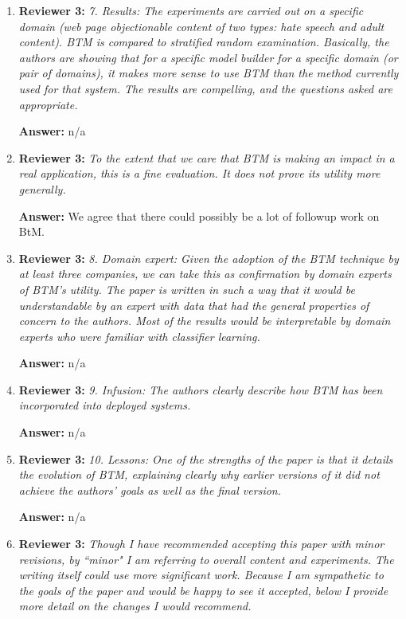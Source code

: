 \documentclass[letterpaper]{article}
\begin{document}
\begin{enumerate}
\item \textbf{Reviewer 3:} \emph{ 7. Results:  The experiments are carried out on a specific domain (web page objectionable content of two types: hate speech and adult content). BTM is compared to stratified random examination. Basically, the authors are showing that for a specific model builder for a specific domain (or pair of domains), it makes more sense to use BTM than the method currently used for that system.  The results are compelling, and the questions asked are appropriate.}

\textbf{Answer:} n/a

\item \textbf{Reviewer 3:} \emph{ To the extent that we care that BTM is making an impact in a real application, this is a fine evaluation.  It does not prove its utility more generally.}

\textbf{Answer:} We agree that there could possibly be a lot of followup work on BtM.

\item \textbf{Reviewer 3:} \emph{ 8. Domain expert: Given the adoption of the BTM technique by at least three companies, we can take this as confirmation by domain experts of BTM's utility. The paper is written in such a way that it would be understandable by an expert with data that had the general properties of concern to the authors. Most of the results would be interpretable by domain experts who were familiar with classifier learning.}

\textbf{Answer:} n/a

\item \textbf{Reviewer 3:} \emph{ 9. Infusion: The authors clearly describe how BTM has been incorporated into deployed systems.}

\textbf{Answer:} n/a

\item \textbf{Reviewer 3:} \emph{ 10. Lessons: One of the strengths of the paper is that it details the evolution of BTM, explaining clearly why earlier versions of it did not achieve the authors' goals as well as the final version.}

\textbf{Answer:} n/a

\item \textbf{Reviewer 3:} \emph{ Though I have recommended accepting this paper with minor revisions, by ``minor" I am referring to overall content and experiments.  The writing itself could use more significant work.  Because I am sympathetic to the goals of the paper and would be happy to see it accepted, below I provide more detail on the changes I would recommend.}


\end{enumerate}
\end{document}
